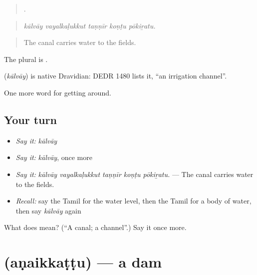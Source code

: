 \begin{quote}
    .
\end{quote}

\begin{quote}
\emph{kālvāy vayalkaḷukkut taṇṇīr koṇṭu pōkiṟatu.}
\end{quote}

\begin{quote}
The canal carries water to the fields.
\end{quote}

The plural is .

\begin{cousinweb}
\textbf{} (\emph{kālvāy}) is native Dravidian: DEDR 1480 lists it, \textquotedblleft{}an irrigation channel\textquotedblright{}.
\end{cousinweb}

\begin{grammarlens}[title={What you've built}]
One more word for getting around.
\end{grammarlens}

\subsection*{Your turn}
\begin{itemize}
\raggedright
  \item \emph{Say it:} \emph{kālvāy}
  \item \emph{Say it:} \emph{kālvāy}, once more
  \item \emph{Say it:} \emph{kālvāy vayalkaḷukkut taṇṇīr koṇṭu pōkiṟatu.} — The canal carries water to the fields.
  \item \emph{Recall:} say the Tamil for the water level, then the Tamil for a body of water, then say \emph{kālvāy} again
\end{itemize}

\begin{tcolorbox}[breakable,colback=teal!4,colframe=teal!35!black,title={Before you move on}]
What does  mean? (\textquotedblleft{}A canal; a channel\textquotedblright{}.) Say it once more.
\end{tcolorbox}
\section[\texorpdfstring{\ta{அணைக்கட்டு} (aṇaikkaṭṭu)}{அணைக்கட்டு (aṇaikkaṭṭu)}]{ (aṇaikkaṭṭu) — a dam}

